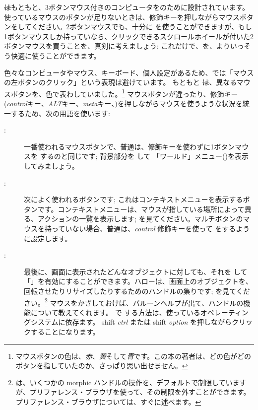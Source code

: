 \documentclass[a4paper,10pt,twoside]{book}
\begin{document}
\st はもともと、3ボタンマウス付きのコンピュータをのために設計されています。使っているマウスのボタンが足りないときは、修飾キーを押しながらマウスボタンを\click してください。2ボタンマウスでも、十分に \pharo を使うことができますが、もし1ボタンマウスしか持っていなら、クリックできるスクロールホイールが付いた2ボタンマウスを買うことを、真剣に考えましょう: これだけで、\pharo を、よりいっそう快適に使うことができます。

色々なコンピュータやマウス、キーボード、個人設定があるため、\pharo では「マウスの左ボタンのクリック」という表現は避けています。
もともと \st は、異なるマウスボタンを、色で表わしていました。\footnote{マウスボタンの色は、\emph{赤}、\emph{黄}そして\emph{青}です。この本の著者は、どの色がどのボタンを指していたのか、さっぱり思い出せません。}
マウスボタンが違ったり、修飾キー(\emph{control}キー、\emph{ALT}キー、\emph{meta}キー、\etc)を押しながらマウスを使うような状況を統一するため、次の用語を使います:
\begin{description}
\item [\click:] 一番使われるマウスボタンで、普通は、修飾キーを使わずに1ボタンマウスを \click するのと同じです; 背景部分を \click して 「ワールド」メニュー()を表示してみましょう。
\item [\actclick:] 次によく使われるボタンです; これはコンテキストメニューを表示するボタンです。コンテキストメニューは、マウスが指している場所によって異る、アクションの一覧を表示します; を見てください。マルチボタンのマウスを持っていない場合、普通は、\emph{control} 修飾キーを使って \actclick をするように設定します。
\item [\metaclick:] 最後に、画面に表示されたどんなオブジェクトに対しても、それを \metaclick して「」を有効にすることができます。ハローは、画面上のオブジェクトを、回転させたりリサイズしたりするためのハンドルの集りです; を見てください。\footnote{\pharo は、いくつかの morphic ハンドルの操作を、デフォルトで制限していますが、プリファレンス・ブラウザを使って、その制限を外すことができます。プリファレンス・ブラウザについては、すぐに述べます。}
マウスをかざしておけば、バルーンヘルプが出て、ハンドルの機能について教えてくれます。
\pharo で \metaclick する方法は、使っているオペレーティングシステムに依存ます。
{\sc shift} \emph{ctrl} または {\sc shift} \emph{option} を押しながらクリックすることになります。
\end{description}
\end{document}
